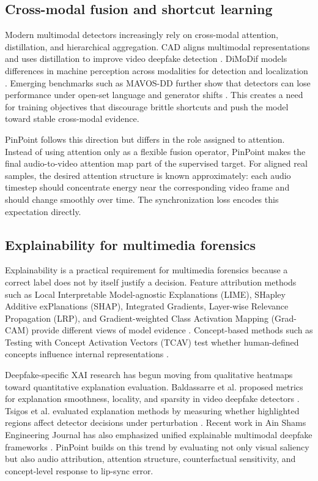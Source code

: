 \documentclass[preprint,12pt,number]{elsarticle}
\begin{document}
\subsection{Cross-modal fusion and shortcut learning}
\label{subsec:fusion}

Modern multimodal detectors increasingly rely on cross-modal attention, distillation, and hierarchical aggregation. CAD aligns multimodal representations and uses distillation to improve video deepfake detection \cite{du2025cad}. DiMoDif models differences in machine perception across modalities for detection and localization \cite{koutlis2024dimodif}. Emerging benchmarks such as MAVOS-DD further show that detectors can lose performance under open-set language and generator shifts \cite{croitoru2025mavos}. This creates a need for training objectives that discourage brittle shortcuts and push the model toward stable cross-modal evidence.

PinPoint follows this direction but differs in the role assigned to attention. Instead of using attention only as a flexible fusion operator, PinPoint makes the final audio-to-video attention map part of the supervised target. For aligned real samples, the desired attention structure is known approximately: each audio timestep should concentrate energy near the corresponding video frame and should change smoothly over time. The synchronization loss encodes this expectation directly.

\subsection{Explainability for multimedia forensics}
\label{subsec:xai_related}

Explainability is a practical requirement for multimedia forensics because a correct label does not by itself justify a decision. Feature attribution methods such as Local Interpretable Model-agnostic Explanations (LIME), SHapley Additive exPlanations (SHAP), Integrated Gradients, Layer-wise Relevance Propagation (LRP), and Gradient-weighted Class Activation Mapping (Grad-CAM) provide different views of model evidence \cite{ribeiro2016lime,lundberg2017shap,sundararajan2017ig,bach2015lrp,selvaraju2017gradcam}. Concept-based methods such as Testing with Concept Activation Vectors (TCAV) test whether human-defined concepts influence internal representations \cite{kim2018tcav}.

Deepfake-specific XAI research has begun moving from qualitative heatmaps toward quantitative explanation evaluation. Baldassarre et al. proposed metrics for explanation smoothness, locality, and sparsity in video deepfake detectors \cite{baldassarre2022metrics}. Tsigos et al. evaluated explanation methods by measuring whether highlighted regions affect detector decisions under perturbation \cite{tsigos2024xai}. Recent work in Ain Shams Engineering Journal has also emphasized unified explainable multimodal deepfake frameworks \cite{kaya2026integrated}. PinPoint builds on this trend by evaluating not only visual saliency but also audio attribution, attention structure, counterfactual sensitivity, and concept-level response to lip-sync error.
\end{document}
